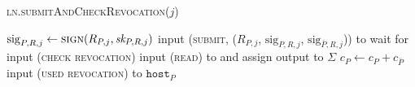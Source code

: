 \begin{center}
  \begin{processbox}{\textsc{ln}.\textsc{submitAndCheckRevocation}($j$)}
    \begin{algorithmic}[1]
      \State $\mathrm{sig}_{P, R, j} \gets \textsc{sign}(R_{P, j}, \textit{sk}_{P, R,
      j})$
      \State input (\textsc{submit}, ($R_{P, j}$, $\mathrm{sig}_{P, R, j}$,
      $\mathrm{sig}_{\bar{P}, R, j}$)) to \ledger
        \State wait for input (\textsc{check revocation}) 
        \State input (\textsc{read}) to \ledger and assign output to $\Sigma$
      \EndWhile
      \State $c_P \gets c_P + c_{\bar{P}}$
        \State input (\textsc{used revocation}) to $\texttt{host}_P$
      \EndIf
    \end{algorithmic}
  \end{processbox}
  \label{code:ln:submit-revocation}
\end{center} \ \\


